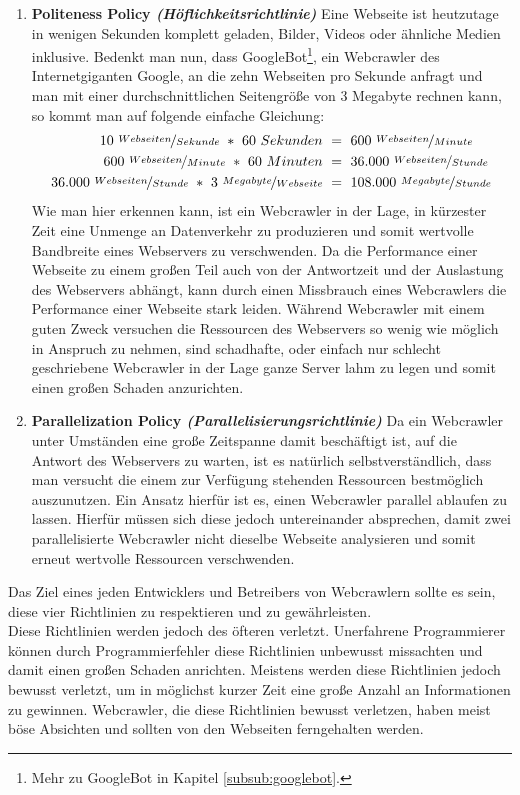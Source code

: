 \begin{enumerate}
	\item \textbf{Politeness Policy \emph{(Höflichkeitsrichtlinie)}}\newline
	Eine Webseite ist heutzutage in wenigen Sekunden komplett geladen, Bilder, Videos oder ähnliche Medien inklusive. Bedenkt man nun, dass GoogleBot\footnote{Mehr zu GoogleBot in Kapitel \ref{subsub:googlebot}.}, ein Webcrawler des Internetgiganten Google, an die zehn Webseiten pro Sekunde\cite{googlebot-anzahl-pro-sekunde} anfragt und man mit einer durchschnittlichen Seitengröße von 3 Megabyte\cite{durch-seitengroesse} rechnen kann, so kommt man auf folgende einfache Gleichung:
	\begin{align*}
		10\ \nicefrac{Webseiten}{Sekunde}\ *\ 60\ Sekunden\ &=\ 600\ \nicefrac{Webseiten}{Minute}\\
		600\ \nicefrac{Webseiten}{Minute}\ *\ 60\ Minuten\ &=\ 36.000\ \nicefrac{Webseiten}{Stunde}\\
		36.000\ \nicefrac{Webseiten}{Stunde}\ *\ 3\ \nicefrac{Megabyte}{Webseite}\ &=\ 108.000\ \nicefrac{Megabyte}{Stunde} 
	\end{align*}
	Wie man hier erkennen kann, ist ein Webcrawler in der Lage, in kürzester Zeit eine Unmenge an Datenverkehr zu produzieren und somit wertvolle Bandbreite eines Webservers zu verschwenden. Da die Performance einer Webseite zu einem großen Teil auch von der Antwortzeit und der Auslastung des Webservers abhängt, kann durch einen Missbrauch eines Webcrawlers die Performance einer Webseite stark leiden. Während Webcrawler mit einem guten Zweck versuchen die Ressourcen des Webservers so wenig wie möglich in Anspruch zu nehmen, sind schadhafte, oder einfach nur schlecht geschriebene Webcrawler in der Lage ganze Server lahm zu legen und somit einen großen Schaden anzurichten.
	\item \textbf{Parallelization Policy \emph{(Parallelisierungsrichtlinie)}}\newline
	Da ein Webcrawler unter Umständen eine große Zeitspanne damit beschäftigt ist, auf die Antwort des Webservers zu warten, ist es natürlich selbstverständlich, dass man versucht die einem zur Verfügung stehenden Ressourcen bestmöglich auszunutzen. Ein Ansatz hierfür ist es, einen Webcrawler parallel ablaufen zu lassen. Hierfür müssen sich diese jedoch untereinander absprechen, damit zwei parallelisierte Webcrawler nicht dieselbe Webseite analysieren und somit erneut wertvolle Ressourcen verschwenden.
\end{enumerate}
Das Ziel eines jeden Entwicklers und Betreibers von Webcrawlern sollte es sein, diese vier Richtlinien zu respektieren und zu gewährleisten.\\
Diese Richtlinien werden jedoch des öfteren verletzt. Unerfahrene Programmierer können durch Programmierfehler diese Richtlinien unbewusst missachten und damit einen großen Schaden anrichten. Meistens werden diese Richtlinien jedoch bewusst verletzt, um in möglichst kurzer Zeit eine große Anzahl an Informationen zu gewinnen. Webcrawler, die diese Richtlinien bewusst verletzen, haben meist böse Absichten und sollten von den Webseiten ferngehalten werden.
\label{subsub:funk}








